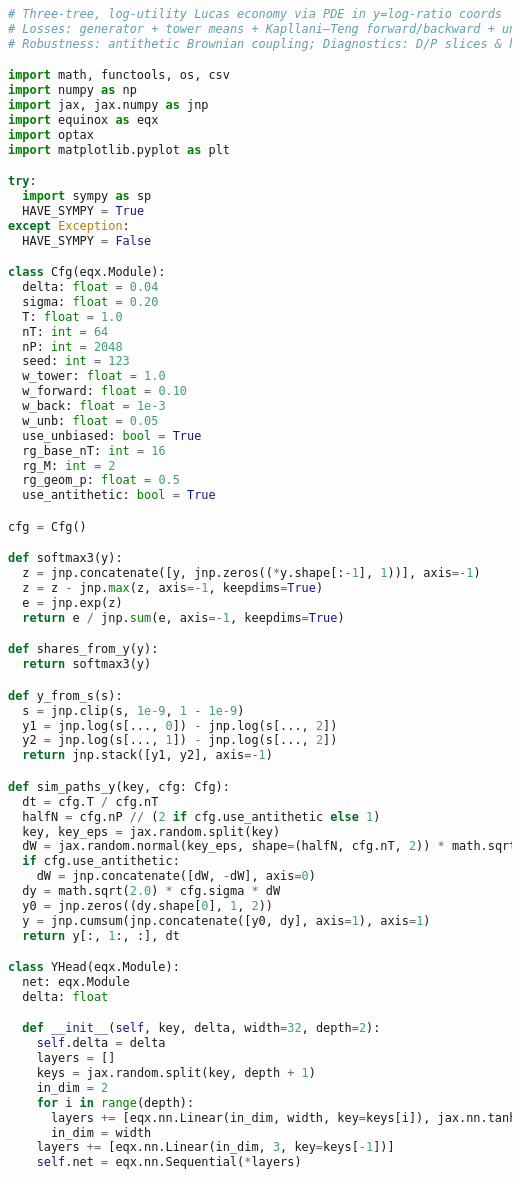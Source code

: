 ﻿\documentclass[11pt,letterpaper,oneside]{article}
\numberwithin{equation}{section}
\newcommand{\1}{\mathbf{1}}
\begin{document}
\begin{lstlisting}[language=Python,basicstyle=\ttfamily\small]
# Three-tree, log-utility Lucas economy via PDE in y=log-ratio coords
# Losses: generator + tower means + Kapllani–Teng forward/backward + unbiased MLMC
# Robustness: antithetic Brownian coupling; Diagnostics: D/P slices & heatmap

import math, functools, os, csv
import numpy as np
import jax, jax.numpy as jnp
import equinox as eqx
import optax
import matplotlib.pyplot as plt

try:
  import sympy as sp
  HAVE_SYMPY = True
except Exception:
  HAVE_SYMPY = False

class Cfg(eqx.Module):
  delta: float = 0.04
  sigma: float = 0.20
  T: float = 1.0
  nT: int = 64
  nP: int = 2048
  seed: int = 123
  w_tower: float = 1.0
  w_forward: float = 0.10
  w_back: float = 1e-3
  w_unb: float = 0.05
  use_unbiased: bool = True
  rg_base_nT: int = 16
  rg_M: int = 2
  rg_geom_p: float = 0.5
  use_antithetic: bool = True

cfg = Cfg()

def softmax3(y):
  z = jnp.concatenate([y, jnp.zeros((*y.shape[:-1], 1))], axis=-1)
  z = z - jnp.max(z, axis=-1, keepdims=True)
  e = jnp.exp(z)
  return e / jnp.sum(e, axis=-1, keepdims=True)

def shares_from_y(y):
  return softmax3(y)

def y_from_s(s):
  s = jnp.clip(s, 1e-9, 1 - 1e-9)
  y1 = jnp.log(s[..., 0]) - jnp.log(s[..., 2])
  y2 = jnp.log(s[..., 1]) - jnp.log(s[..., 2])
  return jnp.stack([y1, y2], axis=-1)

def sim_paths_y(key, cfg: Cfg):
  dt = cfg.T / cfg.nT
  halfN = cfg.nP // (2 if cfg.use_antithetic else 1)
  key, key_eps = jax.random.split(key)
  dW = jax.random.normal(key_eps, shape=(halfN, cfg.nT, 2)) * math.sqrt(dt)
  if cfg.use_antithetic:
    dW = jnp.concatenate([dW, -dW], axis=0)
  dy = math.sqrt(2.0) * cfg.sigma * dW
  y0 = jnp.zeros((dy.shape[0], 1, 2))
  y = jnp.cumsum(jnp.concatenate([y0, dy], axis=1), axis=1)
  return y[:, 1:, :], dt

class YHead(eqx.Module):
  net: eqx.Module
  delta: float

  def __init__(self, key, delta, width=32, depth=2):
    self.delta = delta
    layers = []
    keys = jax.random.split(key, depth + 1)
    in_dim = 2
    for i in range(depth):
      layers += [eqx.nn.Linear(in_dim, width, key=keys[i]), jax.nn.tanh]
      in_dim = width
    layers += [eqx.nn.Linear(in_dim, 3, key=keys[-1])]
    self.net = eqx.nn.Sequential(*layers)


\end{lstlisting}
\end{document}
